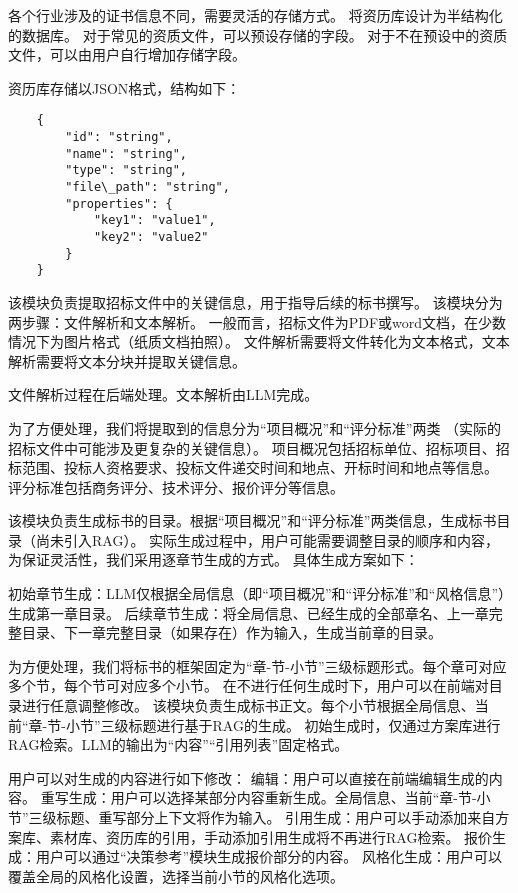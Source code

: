 \documentclass{xmu}
\begin{document}
各个行业涉及的证书信息不同，需要灵活的存储方式。
将资历库设计为半结构化的数据库。
对于常见的资质文件，可以预设存储的字段。
对于不在预设中的资质文件，可以由用户自行增加存储字段。

资历库存储以JSON格式，结构如下：

\begin{verbatim}
    {
        "id": "string",
        "name": "string",
        "type": "string",
        "file\_path": "string",
        "properties": {
            "key1": "value1",
            "key2": "value2"
        }
    }
\end{verbatim}

该模块负责提取招标文件中的关键信息，用于指导后续的标书撰写。
该模块分为两步骤：文件解析和文本解析。
一般而言，招标文件为PDF或word文档，在少数情况下为图片格式（纸质文档拍照）。
文件解析需要将文件转化为文本格式，文本解析需要将文本分块并提取关键信息。

文件解析过程在后端处理。文本解析由LLM完成。

为了方便处理，我们将提取到的信息分为“项目概况”和“评分标准”两类
（实际的招标文件中可能涉及更复杂的关键信息）。
项目概况包括招标单位、招标项目、招标范围、投标人资格要求、投标文件递交时间和地点、开标时间和地点等信息。
评分标准包括商务评分、技术评分、报价评分等信息。

该模块负责生成标书的目录。根据“项目概况”和“评分标准”两类信息，生成标书目录（尚未引入RAG）。
实际生成过程中，用户可能需要调整目录的顺序和内容，为保证灵活性，我们采用逐章节生成的方式。
具体生成方案如下：

初始章节生成：LLM仅根据全局信息（即“项目概况”和“评分标准”和“风格信息”）生成第一章目录。
后续章节生成：将全局信息、已经生成的全部章名、上一章完整目录、下一章完整目录（如果存在）作为输入，生成当前章的目录。

为方便处理，我们将标书的框架固定为“章-节-小节”三级标题形式。每个章可对应多个节，每个节可对应多个小节。
在不进行任何生成时下，用户可以在前端对目录进行任意调整修改。
该模块负责生成标书正文。每个小节根据全局信息、当前“章-节-小节”三级标题进行基于RAG的生成。
初始生成时，仅通过方案库进行RAG检索。LLM的输出为“内容”“引用列表”固定格式。

用户可以对生成的内容进行如下修改：
编辑：用户可以直接在前端编辑生成的内容。
重写生成：用户可以选择某部分内容重新生成。全局信息、当前“章-节-小节”三级标题、重写部分上下文将作为输入。
引用生成：用户可以手动添加来自方案库、素材库、资历库的引用，手动添加引用生成将不再进行RAG检索。
报价生成：用户可以通过“决策参考”模块生成报价部分的内容。
风格化生成：用户可以覆盖全局的风格化设置，选择当前小节的风格化选项。
\end{document}
